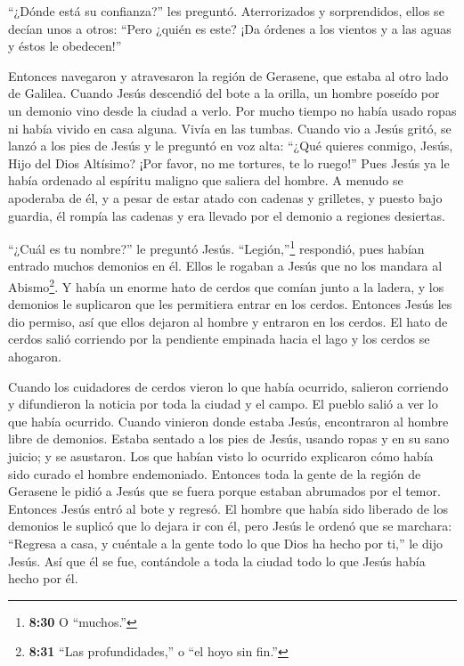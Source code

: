  ``¿Dónde está su confianza?'' les preguntó. Aterrorizados
y sorprendidos, ellos se decían unos a otros: ``Pero ¿quién es este? ¡Da
órdenes a los vientos y a las aguas y éstos le obedecen!''

 Entonces navegaron y atravesaron la región de Gerasene,
que estaba al otro lado de Galilea.  Cuando Jesús descendió
del bote a la orilla, un hombre poseído por un demonio vino desde la
ciudad a verlo. Por mucho tiempo no había usado ropas ni había vivido en
casa alguna. Vivía en las tumbas.  Cuando vio a Jesús
gritó, se lanzó a los pies de Jesús y le preguntó en voz alta: ``¿Qué
quieres conmigo, Jesús, Hijo del Dios Altísimo? ¡Por favor, no me
tortures, te lo ruego!''  Pues Jesús ya le había ordenado
al espíritu maligno que saliera del hombre. A menudo se apoderaba de él,
y a pesar de estar atado con cadenas y grilletes, y puesto bajo guardia,
él rompía las cadenas y era llevado por el demonio a regiones desiertas.

 ``¿Cuál es tu nombre?'' le preguntó Jesús.
``Legión,''\footnote{\textbf{8:30} O ``muchos.''} respondió, pues habían
entrado muchos demonios en él.  Ellos le rogaban a Jesús
que no los mandara al Abismo\footnote{\textbf{8:31} ``Las
  profundidades,'' o ``el hoyo sin fin.''}.  Y había un
enorme hato de cerdos que comían junto a la ladera, y los demonios le
suplicaron que les permitiera entrar en los cerdos. Entonces Jesús les
dio permiso,  así que ellos dejaron al hombre y entraron en
los cerdos. El hato de cerdos salió corriendo por la pendiente empinada
hacia el lago y los cerdos se ahogaron.

 Cuando los cuidadores de cerdos vieron lo que había
ocurrido, salieron corriendo y difundieron la noticia por toda la ciudad
y el campo.  El pueblo salió a ver lo que había ocurrido.
Cuando vinieron donde estaba Jesús, encontraron al hombre libre de
demonios. Estaba sentado a los pies de Jesús, usando ropas y en su sano
juicio; y se asustaron.  Los que habían visto lo ocurrido
explicaron cómo había sido curado el hombre endemoniado. 
Entonces toda la gente de la región de Gerasene le pidió a Jesús que se
fuera porque estaban abrumados por el temor. Entonces Jesús entró al
bote y regresó.  El hombre que había sido liberado de los
demonios le suplicó que lo dejara ir con él, pero Jesús le ordenó que se
marchara:  ``Regresa a casa, y cuéntale a la gente todo lo
que Dios ha hecho por ti,'' le dijo Jesús. Así que él se fue, contándole
a toda la ciudad todo lo que Jesús había hecho por él.

